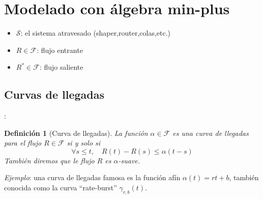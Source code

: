 \documentclass[xcolor={x11names}]{beamer}
\newtheorem{definicion}{Definición}[section]
\begin{document}
\section{Modelado con álgebra min-plus}
\begin{frame}{\secname}

    \begin{figure}[h]
        \centering
        
    \end{figure}

    \vfill

    \begin{itemize}
        \item $\mathcal{S}$: el sistema
            atravesado (shaper,router,colas,etc.)
        \item $R\in\mathcal{F}$: flujo entrante
        \item $R^*\in\mathcal{F}$:
            flujo saliente
    \end{itemize}

    \vfill

    \begin{figure}[h]
        \centering
        
    \end{figure}
\end{frame}


\subsection{Curvas de llegadas}
\begin{frame}{\secname: \subsecname}
    \begin{definicion}[Curva de llegadas]
        La función $\alpha\in\mathcal{F}$
        es una curva de llegadas para
        el flujo $R\in\mathcal{F}$
        si y solo si
        \begin{equation*}
            \forall s\leq t,\quad
            R(t)-R(s)\leq \alpha(t-s)
        \end{equation*}
        También diremos que le flujo $R$
        es $\alpha$-suave.
    \end{definicion}

    \vfill

    \emph{Ejemplo}: una curva de
    llegadas famosa es la función
    afín $\alpha(t)=rt+b$, también
    conocida como la curva ``rate-burst''
    $\gamma_{r,b}(t)$.

    \vfill

    \begin{figure}[h]
        \centering
        
    \end{figure}
\end{frame}
\end{document}
